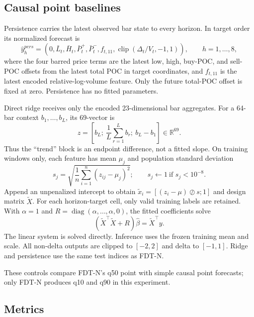 \documentclass[10pt]{article}
\newcommand{\R}{\mathbb{R}}
\newcommand{\clip}{\operatorname{clip}}
\begin{document}
\subsection{Causal point baselines}

Persistence carries the latest observed bar state to every horizon. In target order its normalized
forecast is
\begin{equation}
\widehat y_h^{pers}=\left(0,\bar L_t,\bar H_t,\bar P_t^+,\bar P_t^-,f_{t,11},
\clip(\Delta_t/V_t,-1,1)\right),\qquad h=1,\ldots,8,
\label{eq:persistence}
\end{equation}
where the four barred price terms are the latest low, high, buy-POC, and sell-POC offsets from the
latest total POC in target coordinates, and $f_{t,11}$ is the latest encoded relative-log-volume
feature. Only the future total-POC offset is fixed at zero. Persistence has no fitted parameters.

Direct ridge receives only the encoded 23-dimensional bar aggregates. For a 64-bar context
$b_1,\ldots,b_L$, its 69-vector is
\begin{equation}
z=\left[b_L;\ \frac{1}{L}\sum_{r=1}^{L}b_r;\ b_L-b_1\right]\in\R^{69}.
\label{eq:ridge-features}
\end{equation}
Thus the ``trend'' block is an endpoint difference, not a fitted slope. On training windows only,
each feature has mean $\mu_j$ and population standard deviation
\begin{equation}
s_j=\sqrt{\frac{1}{n}\sum_{i=1}^n(z_{ij}-\mu_j)^2};
\qquad s_j\leftarrow1\ \text{if }s_j<10^{-8}.
\end{equation}
Append an unpenalized intercept to obtain
$\widetilde x_i=[(z_i-\mu)\oslash s;1]$ and design matrix $\widetilde X$. For each horizon-target cell,
only valid training labels are retained. With $\alpha=1$ and
$R=\operatorname{diag}(\alpha,\ldots,\alpha,0)$, the fitted coefficients solve
\begin{equation}
(\widetilde X^\top\widetilde X+R)\widehat\beta=\widetilde X^\top y.
\label{eq:ridge}
\end{equation}
The linear system is solved directly. Inference uses the frozen training mean and scale. All
non-delta outputs are clipped to $[-2,2]$ and delta to $[-1,1]$. Ridge and persistence use the same
test indices as FDT-N.

These controls compare FDT-N's q50 point with simple causal point forecasts; only FDT-N produces q10
and q90 in this experiment.

\subsection{Metrics}
\end{document}
